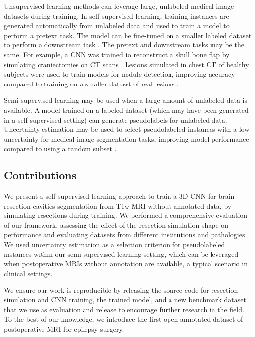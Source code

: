 Unsupervised learning methods can leverage large, unlabeled medical image datasets during training.
In self-supervised learning, training instances are generated automatically from unlabeled data and used to train a model to perform a pretext task. %
The model can be fine-tuned on a smaller labeled dataset to perform a downstream task \cite{chen_self-supervised_2019}.
The pretext and downstream tasks may be the same.
For example, a \ac{CNN} was trained to reconstruct a skull bone flap by simulating craniectomies on CT scans \cite{matzkin_self-supervised_2020}.
Lesions simulated in chest CT of healthy subjects were used to train models for nodule detection, improving accuracy compared to training on a smaller dataset of real lesions \cite{pezeshk_seamless_2017}.

Semi-supervised learning may be used when a large amount of unlabeled data is available.
A model trained on a labeled dataset (which may have been generated in a self-supervised setting) can generate pseudolabels for unlabeled data.
Uncertainty estimation may be used to select pseudolabeled instances with a low uncertainty for medical image segmentation tasks, improving model performance compared to using a random subset \cite{venturini_uncertainty_2020}.


\subsection{Contributions}

We present a self-supervised learning approach to train a 3D \ac{CNN} for brain resection cavities segmentation from \ac{T1w} \ac{MRI} without annotated data, by simulating resections during training.
We performed a comprehensive evaluation of our framework, assessing the effect of the resection simulation shape on performance and evaluating datasets from different institutions and pathologies.
We used uncertainty estimation as a selection criterion for pseudolabeled instances within our semi-supervised learning setting, which can be leveraged when postoperative \acp{MRI} without annotation are available, a typical scenario in clinical settings.

We ensure our work is reproducible by releasing the source code for resection simulation and \ac{CNN} training, the trained model, and a new benchmark dataset that we use as evaluation and release to encourage further research in the field.
To the best of our knowledge, we introduce the first open annotated dataset of postoperative \ac{MRI} for epilepsy surgery.
